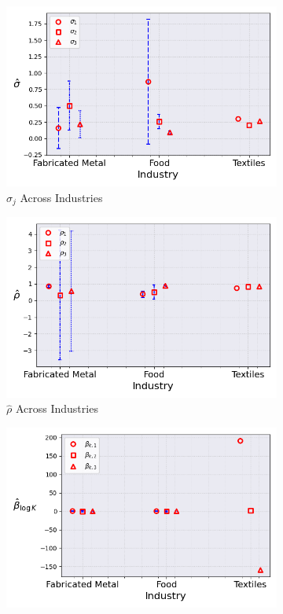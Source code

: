 \documentclass{article}
\begin{document}
\begin{figure}[ht!]
\begin{subfigure}[t]{0.32\textwidth}
        \centering
        \includegraphics[width=\textwidth]{figure/ar1_normal_kmshare_ciiu_sigma_across_industries_m3.png}
        \caption{$\hat\sigma_j$ Across Industries}
    \end{subfigure}
    \begin{subfigure}[t]{0.32\textwidth}
        \centering
        \includegraphics[width=\textwidth]{figure/ar1_normal_kmshare_ciiu_rho_across_industries_m3.png}
        \caption{$\hat\rho$ Across Industries}
    \end{subfigure}
    \begin{subfigure}[t]{0.32\textwidth}
        \centering
        \includegraphics[width=\textwidth]{figure/ar1_normal_kmshare_ciiu_beta_k_across_industries_m3.png}

\end{subfigure}
\end{figure}
\end{document}
